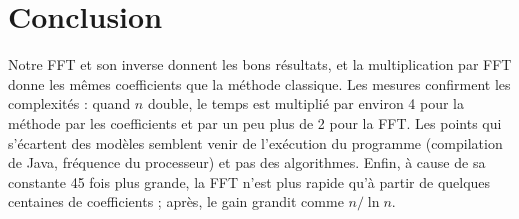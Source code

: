 \documentclass[11pt,a4paper]{article}
\begin{document}
\section{Conclusion}

Notre FFT et son inverse donnent les bons résultats, et la multiplication par FFT
donne les mêmes coefficients que la méthode classique. Les mesures confirment les
complexités : quand $n$ double, le temps est multiplié par environ 4 pour la méthode
par les coefficients et par un peu plus de 2 pour la FFT. Les points qui
s'écartent des modèles semblent venir de l'exécution du programme (compilation de
Java, fréquence du processeur) et pas des algorithmes. Enfin, à cause de sa constante 45 fois plus grande, la FFT
n'est plus rapide qu'à partir de quelques centaines de coefficients ; après, le gain
grandit comme $n / \ln n$.
\end{document}
